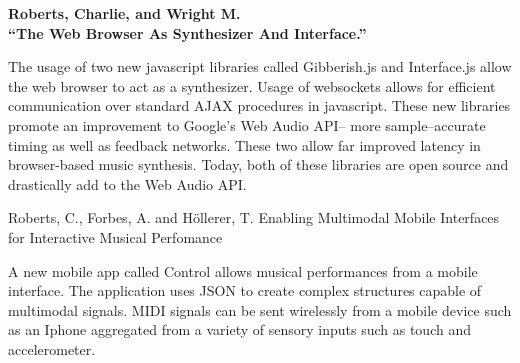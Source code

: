 {\bf\noindent
\cite{RobertsCharlieWright}
 Roberts, Charlie, and Wright M. \\
``The Web Browser As Synthesizer And Interface.''\\ 
}

The usage of two new javascript libraries called Gibberish.js and Interface.js allow the web browser to act as a synthesizer. Usage of websockets allows for efficient communication over standard AJAX procedures in javascript. These new libraries promote an improvement to Google's Web Audio API-- more sample--accurate timing as well as feedback networks. These two allow far improved latency in browser-based music synthesis. Today, both of these libraries are open source and drastically add to the Web Audio API.



{Roberts, C., Forbes, A. and H\"ollerer, T.}
{Enabling Multimodal Mobile Interfaces for Interactive Musical Perfomance}


A new mobile app called Control allows musical performances from a mobile interface. The application uses JSON to create complex structures capable of multimodal signals. MIDI signals can be sent wirelessly from a mobile device such as an Iphone aggregated from a variety of sensory inputs such as touch and accelerometer. 

